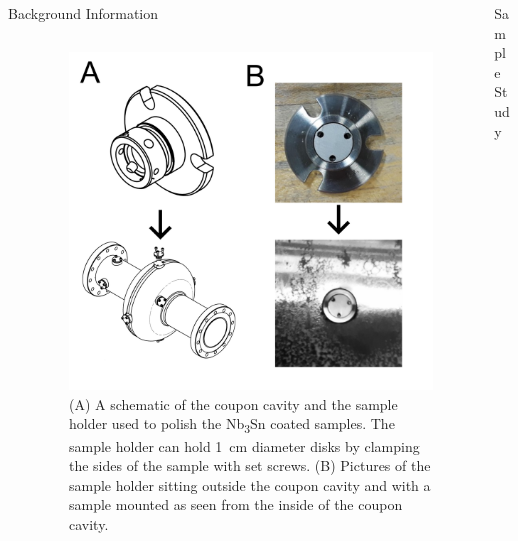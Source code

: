 \documentclass{beamer}
\begin{document}
\begin{frame}{}
\begin{columns}[t]
\begin{column}{0.32\linewidth}
\begin{block}{\label{sec:backgroundinformation}Background Information}
\begin{columns}[t]
\begin{column}{0.45\columnwidth}
\begin{itemize}
                            \end{itemize}  
                        \end{column}
                        \begin{column}{0.45\columnwidth}
                            \begin{figure}[t]%
                                \centering%
                                \includegraphics[width=\columnwidth]{../doc/figs/Coupon_Cavity.png}%
                                \caption{(A) A schematic of the coupon cavity and the sample holder used to polish the Nb\textsubscript{3}Sn coated samples. The sample holder can hold 1~cm diameter disks by clamping the sides of the sample with set screws. (B) Pictures of the sample holder sitting outside the coupon cavity and with a sample mounted as seen from the inside of the coupon cavity.}%
                                \label{fig:couponcavity}%
                            \end{figure}
                        \end{column}
                    \end{columns}
                \end{block}
            \end{column}
            \begin{column}{0.32\linewidth}    
                \begin{block}{\label{sec:samplestudy}Sample Study}

\end{block}
\end{column}
\end{columns}
\end{frame}
\end{document}
